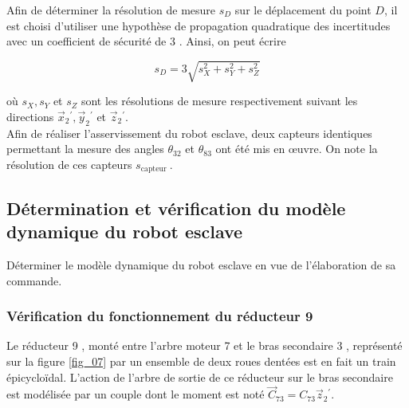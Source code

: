 

Afin de déterminer la résolution de mesure $s_{D}$ sur le déplacement du point $D$, il est choisi d'utiliser une hypothèse de propagation quadratique des incertitudes avec un coefficient de sécurité de 3 . Ainsi, on peut écrire

$$
s_{D}=3 \sqrt{s_{X}^{2}+s_{Y}^{2}+s_{Z}^{2}}
$$

où $s_{X}, s_{Y}$ et $s_{Z}$ sont les résolutions de mesure respectivement suivant les directions $\vec{x}_{2}{ }^{\prime}, \vec{y}_{2}{ }^{\prime}$ et $\vec{z}_{2}{ }^{\prime}$.\\
Afin de réaliser l'asservissement du robot esclave, deux capteurs identiques permettant la mesure des angles $\theta_{32}$ et $\theta_{83}$ ont été mis en œuvre. On note la résolution de ces capteurs $s_{\text {capteur }}$.\\


\subsection{Détermination et vérification du modèle dynamique du robot esclave}
\begin{obj}
Déterminer le modèle dynamique du robot esclave en vue de l'élaboration de sa commande.
\end{obj}
\subsubsection{Vérification du fonctionnement du réducteur 9}
Le réducteur 9 , monté entre l'arbre moteur 7 et le bras secondaire 3 , représenté sur la figure \ref{fig_07} par un ensemble de deux roues dentées est en fait un train épicycloïdal. L'action de l'arbre de sortie de ce réducteur sur le bras secondaire est modélisée par un couple dont le moment est noté $\vec{C}_{73}=C_{73} \vec{z}_{2}{ }^{\prime}$.

